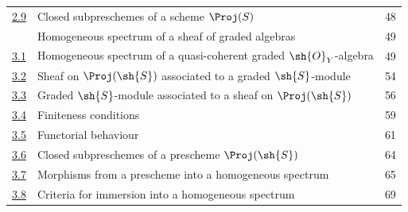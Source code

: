 \begin{longtable}{@{}p{}p{}r@{}}
\hyperref[subsection:II.2.9]{2.9} & Closed subpreschemes of a scheme $\Proj(S)$ & 48\\
\hyperref[section:II.3]{\textsection3} & Homogeneous spectrum of a sheaf of graded algebras & 49\\
\hyperref[subsection:II.3.1]{3.1} & Homogeneous spectrum of a quasi-coherent graded
$\sh{O}_Y$-algebra & 49\\
\hyperref[subsection:II.3.2]{3.2} & Sheaf on $\Proj(\sh{S})$ associated to a graded
$\sh{S}$-module & 54\\
\hyperref[subsection:II.3.3]{3.3} & Graded $\sh{S}$-module associated to a sheaf on
$\Proj(\sh{S})$ & 56\\
\hyperref[subsection:II.3.4]{3.4} & Finiteness conditions & 59\\
\hyperref[subsection:II.3.5]{3.5} & Functorial behaviour & 61\\
\hyperref[subsection:II.3.6]{3.6} & Closed subpreschemes of a prescheme $\Proj(\sh{S})$ & 64\\
\hyperref[subsection:II.3.7]{3.7} & Morphisms from a prescheme into a homogeneous spectrum & 65\\
\hyperref[subsection:II.3.8]{3.8} & Criteria for immersion into a homogeneous spectrum & 69\\
\end{longtable}

